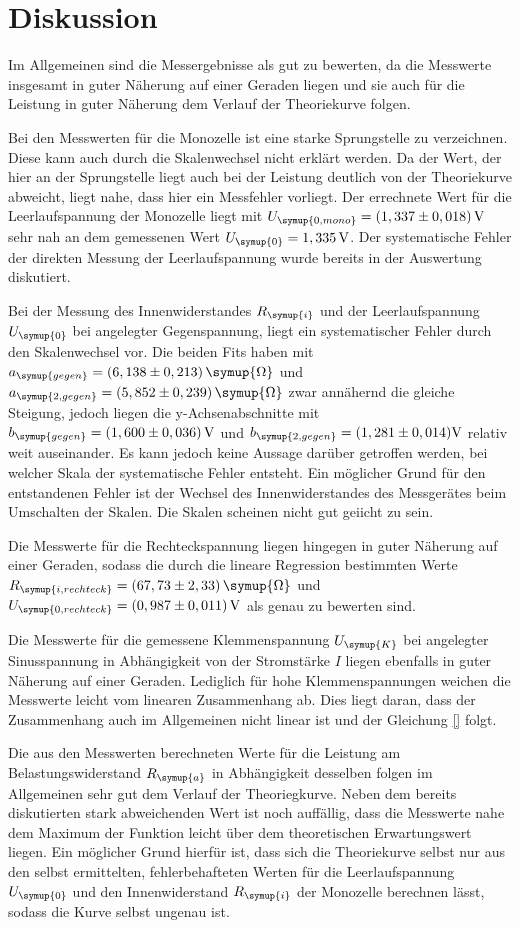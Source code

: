 \section{Diskussion}
\label{sec:Diskussion}

Im Allgemeinen sind die Messergebnisse als gut zu bewerten, da die Messwerte
insgesamt in guter Näherung auf einer Geraden liegen und sie auch für die
Leistung in guter Näherung dem Verlauf der Theoriekurve folgen.

Bei den Messwerten für die Monozelle ist eine starke Sprungstelle zu verzeichnen.
Diese kann auch durch die Skalenwechsel nicht erklärt werden. Da der Wert, der
hier an der Sprungstelle liegt auch bei der Leistung deutlich von der
Theoriekurve abweicht, liegt nahe, dass hier ein Messfehler vorliegt. Der errechnete
Wert für die Leerlaufspannung der Monozelle liegt mit
$U_{\symup{0,mono}}=(1,337\pm0,018)\,\text{V}$ sehr nah an dem gemessenen
Wert $U_{\symup{0}}=1,335\,\text{V}$. Der systematische Fehler der direkten
Messung der Leerlaufspannung wurde bereits in der Auswertung diskutiert.

Bei der Messung des Innenwiderstandes $R_{\symup{i}}$ und der Leerlaufspannung
$U_{\symup{0}}$ bei angelegter Gegenspannung, liegt ein systematischer Fehler durch
den Skalenwechsel vor. Die beiden Fits haben mit
$a_{\symup{gegen}}=(6,138\pm0,213)\,\symup{\Omega}$ und
$a_{\symup{2,gegen}}=(5,852\pm0,239)\,\symup{\Omega}$ zwar annähernd
die gleiche Steigung, jedoch liegen die y-Achsenabschnitte mit
$b_{\symup{gegen}}=(1,600\pm0,036)\,\text{V}$ und
$b_{\symup{2,gegen}}=(1,281\pm0,014)\text{V}$
relativ weit auseinander. Es kann jedoch keine Aussage darüber getroffen werden,
bei welcher Skala der systematische Fehler entsteht. Ein möglicher Grund für den
entstandenen Fehler ist der Wechsel des Innenwiderstandes des Messgerätes beim
Umschalten der Skalen. Die Skalen scheinen nicht gut geiicht zu sein.

Die Messwerte für die Rechteckspannung liegen hingegen in guter Näherung auf einer Geraden,
sodass die durch die lineare Regression bestimmten Werte
$R_{\symup{i,rechteck}}=(67,73\pm2,33)\,\symup{\Omega}$ und
$U_{\symup{0,rechteck}}=(0,987\pm0,011)\,\text{V}$ als genau zu bewerten sind.

Die Messwerte für die gemessene Klemmenspannung $U_{\symup{K}}$ bei angelegter
Sinusspannung in Abhängigkeit von der Stromstärke $I$ liegen ebenfalls in guter Näherung auf
einer Geraden. Lediglich für hohe Klemmenspannungen weichen die Messwerte leicht
vom linearen Zusammenhang ab. Dies liegt daran, dass der Zusammenhang auch im Allgemeinen
nicht linear ist und der Gleichung \eqref{} folgt.

Die aus den Messwerten berechneten Werte für die Leistung am Belastungswiderstand
$R_{\symup{a}}$ in Abhängigkeit desselben folgen im Allgemeinen sehr gut dem Verlauf
der Theoriegkurve. Neben dem bereits diskutierten stark abweichenden Wert ist noch
auffällig, dass die Messwerte nahe dem Maximum der Funktion leicht über dem theoretischen
Erwartungswert liegen. Ein möglicher Grund hierfür ist, dass sich die Theoriekurve selbst
nur aus den selbst ermittelten, fehlerbehafteten Werten für die Leerlaufspannung
$U_{\symup{0}}$ und den Innenwiderstand $R_{\symup{i}}$ der Monozelle
berechnen lässt, sodass die Kurve selbst ungenau ist.
